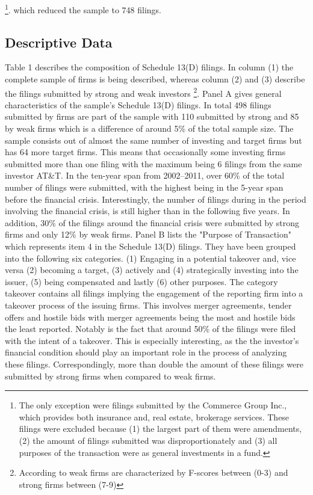 \documentclass[12pt]{article}
\begin{document}
	\footnote{The only exception were filings submitted by the Commerce Group Inc., which provides both insurance and, real estate, brokerage services. These filings were excluded because (1) the largest part of them were amendments, (2) the amount of filings submitted was disproportionately and (3) all purposes of the transaction were as general investments in a fund.}.
which reduced the sample to 748 filings. 

\subsection{Descriptive Data}
Table 1 describes the composition of Schedule 13(D) filings. In column (1) the complete sample of firms is being described, whereas column (2) and (3) describe the filings submitted by strong and weak investors 
	\footnote{According to \citet{Mohr2012} weak firms are characterized by F-scores between (0-3) and strong firms between (7-9)}.
Panel A gives general characteristics of the sample's Schedule 13(D) filings. In total 498 filings submitted by firms are part of the sample with 110 submitted by strong and 85 by weak firms which is a difference of around 5\% of the total sample size. The sample consists out of almost the same number of investing and target firms but has 64 more target firms. This means that occasionally some investing firms submitted more than one filing with the maximum being 6 filings from the same investor AT\&T.
In the ten-year span from 2002--2011, over 60\% of the total number of filings were submitted, with the highest being in the 5-year span before the financial crisis.  Interestingly, the number of filings during in the period involving the financial crisis, is still higher than in the following five years. In addition, 30\% of the filings around the financial crisis were submitted by strong firms and only 12\% by weak firms.
Panel B lists the "Purpose of Transaction" which represents item 4 in the Schedule 13(D) filings. They have been grouped into the following six categories. (1) Engaging in a potential takeover and, vice versa (2) becoming a target, (3) actively and (4) strategically investing into the issuer, (5) being compensated and lastly (6) other purposes. 
The category takeover contains all filings implying the engagement of the reporting firm into a takeover process of the issuing firms. This involves merger agreements, tender offers and hostile bids with merger agreements being the most and hostile bids the least reported. Notably is the fact that around 50\% of the filings were filed with the intent of a takeover. This is especially interesting, as the the investor's financial condition should play an important role in the process of analyzing these filings. Correspondingly, more than double the amount of these filings were submitted by strong firms when compared to weak firms.
\end{document}
